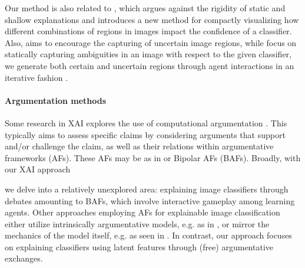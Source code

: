 Our method is also related to
\cite{shitole2021one}, which argues against the rigidity of static and shallow explanations and introduces a new method for compactly visualizing how different combinations of regions in images impact the confidence of a classifier. 
Also, \cite{wang2019deliberative} aims to encourage the capturing of uncertain image regions, 
while \cite{wang2019deliberative} focus on statically capturing ambiguities in an image with respect to the given classifier, we generate both certain and uncertain regions through %
agent interactions in an iterative fashion \cite{Thauvin_24}.


\paragraph{Argumentation methods}
Some research in XAI explores the use of computational argumentation \cite{vcyras2021argumentative}. 
This typically aims to assess specific claims by considering arguments that %
support and/or challenge the claim, as well as their relations within %
argumentative frameworks (AFs). 
These AFs 
may be as in \cite{dung1995acceptability} or %
Bipolar AFs (BAFs).
Broadly, with our XAI 
approach 
\iffalse leads to debates that can be viewed as %
simple BAFs; however, conducting a comprehensive analysis of these AFs' properties is beyond the scope of this paper. 
Instead, 
\fi 
we delve into a relatively unexplored area: explaining image classifiers through debates amounting to %
BAFs, which involve interactive gameplay among learning %
agents. 
%
Other approaches employing AFs for explainable image classification either utilize intrinsically argumentative models, e.g. as in \cite{hamed}, or mirror the mechanics of the model itself, e.g. as seen in  \cite{Purin21}. 
In contrast, our approach focuses on explaining classifiers using latent features through (free) argumentative exchanges.

%



